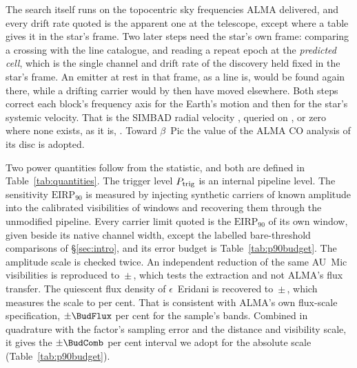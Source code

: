 The search itself runs on the topocentric sky frequencies ALMA delivered, and
every drift rate quoted is the apparent one at the telescope, except where a
table gives it in the star's frame. Two later steps
need the star's own frame: comparing a crossing with the line catalogue, and
reading a repeat epoch at the \emph{predicted cell}, which is the single
channel and drift rate of the discovery held fixed in the star's frame. An
emitter at rest in that frame, as a line is, would be found again there,
while a drifting carrier would by then have moved elsewhere. Both steps
correct each block's frequency axis for the Earth's motion and then for the
star's systemic velocity. That is the SIMBAD radial velocity \citep{SIMBAD2000},
queried on \SimbadQueryDate, or zero where none exists, as it is,
\FrZeroVsysClause. Toward $\beta$~Pic the value of the ALMA CO analysis of
its disc \citep{Matra2017} is adopted.

Two power quantities follow from the statistic, and both are defined in
Table~\ref{tab:quantities}. The trigger level $P_{\rm trig}$ is an internal
pipeline level. The sensitivity $\mathrm{EIRP}_{90}$ is measured by injecting
synthetic carriers of known amplitude into the calibrated visibilities of
\SensNInj{} windows and recovering them through the unmodified pipeline.
Every carrier limit quoted is the $\mathrm{EIRP}_{90}$ of its own window,
given beside its native channel width, except the labelled bare-threshold
comparisons of \S\ref{sec:intro}, and its error budget is
Table~\ref{tab:p90budget}. The
amplitude scale is checked twice. An independent reduction of the same
AU~Mic visibilities is reproduced to \PxJanRatio\,$\pm$\,\PxJanRatioErr,
which tests the extraction and not ALMA's flux transfer. The quiescent flux
density of $\epsilon$~Eridani \citep{Burton2022} is recovered to
\PxEpsRatio\,$\pm$\,\PxEpsRatioErr, which measures the scale to \SbEpsPct{}
per cent. That is consistent with ALMA's own flux-scale specification,
$\pm\BudFlux$ per cent for the sample's bands. Combined in quadrature
with the factor's sampling error and the distance and visibility scale, it
gives the $\pm\BudComb$ per cent interval we adopt
for the absolute scale (Table~\ref{tab:p90budget}).

